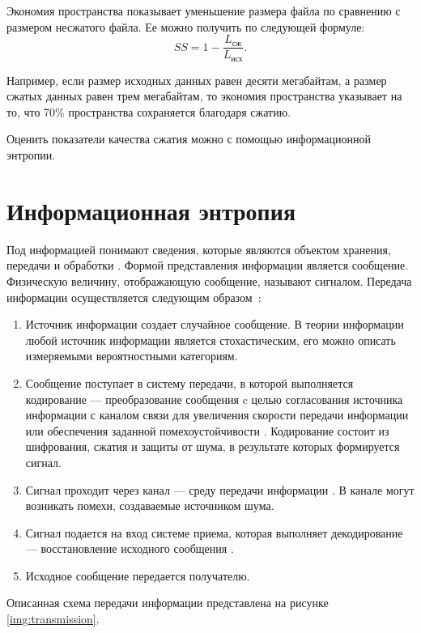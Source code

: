 Экономия пространства показывает уменьшение размера файла по сравнению с размером несжатого файла. Ее можно получить по следующей формуле:
\begin{equation}
	SS = 1 - \frac{L_{\text{сж}}}{L_{\text{исх}}}.
\end{equation}

Например, если размер исходных данных равен десяти мегабайтам, а размер сжатых данных равен трем мегабайтам, то экономия пространства указывает на то, что 70\% пространства сохраняется благодаря сжатию.

Оценить показатели качества сжатия можно с помощью информационной энтропии.

\section{Информационная энтропия}\label{ientropy}

Под информацией понимают сведения, которые являются объектом хранения, передачи и обработки \cite{information}. Формой представления информации является сообщение. Физическую величину, отображающую сообщение, называют сигналом. Передача информации осуществляется следующим образом~\cite{transmission}:

\begin{enumerate}
	\item Источник информации создает случайное сообщение. В теории информации любой источник информации является стохастическим, его можно описать измеряемыми вероятностными категориям.
	\item Сообщение поступает в систему передачи, в которой выполняется кодирование --- преобразование сообщения c целью согласования источника информации с каналом связи для увеличения скорости передачи информации или обеспечения заданной помехоустойчивости  \cite{information}. Кодирование состоит из шифрования, сжатия и защиты от шума, в результате которых формируется сигнал. 
	\item Сигнал проходит через канал --- среду передачи информации \cite{transmission}. В канале могут возникать помехи, создаваемые источником шума.
	\item Сигнал подается на вход системе приема, которая выполняет декодирование --- восстановление исходного сообщения \cite{information}.
	\item Исходное сообщение передается получателю.
\end{enumerate}

Описанная схема передачи информации представлена на рисунке \ref{img:transmission}.

